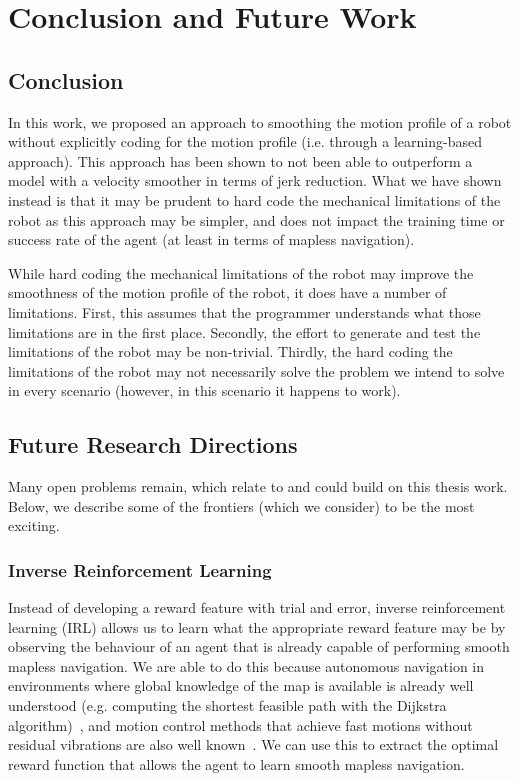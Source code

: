 \chapter{Conclusion and Future Work}
\label{ch:concl}

\section{Conclusion}

In this work, we proposed an approach to smoothing the motion profile of a robot without explicitly coding for the motion profile (i.e. through a learning-based approach). This approach has been shown to not been able to outperform a model with a velocity smoother in terms of jerk reduction. What we have shown instead is that it may be prudent to hard code the mechanical limitations of the robot as this approach may be simpler, and does not impact the training time or success rate of the agent (at least in terms of mapless navigation).

While hard coding the mechanical limitations of the robot may improve the smoothness of the motion profile of the robot, it does have a number of limitations. First, this assumes that the programmer understands what those limitations are in the first place. Secondly, the effort to generate and test the limitations of the robot may be non-trivial. Thirdly, the hard coding the limitations of the robot may not necessarily solve the problem we intend to solve in every scenario (however, in this scenario it happens to work).

\section{Future Research Directions}
Many open problems remain, which relate to and could build on this thesis work. Below, we describe some of the frontiers (which we consider) to be the most exciting.

\subsection{Inverse Reinforcement Learning}
Instead of developing a reward feature with trial and error, inverse reinforcement learning (IRL) allows us to learn what the appropriate reward feature may be by observing the behaviour of an agent that is already capable of performing smooth mapless navigation. We are able to do this because autonomous navigation in environments where global knowledge of the map is available is already well understood (e.g. computing the shortest feasible path with the Dijkstra algorithm)~\cite{lavalle_planning_2006}, and motion control methods that achieve fast motions without residual vibrations are also well known~\cite{meckl_optimized_1998}. We can use this to extract the optimal reward function that allows the agent to learn smooth mapless navigation.

